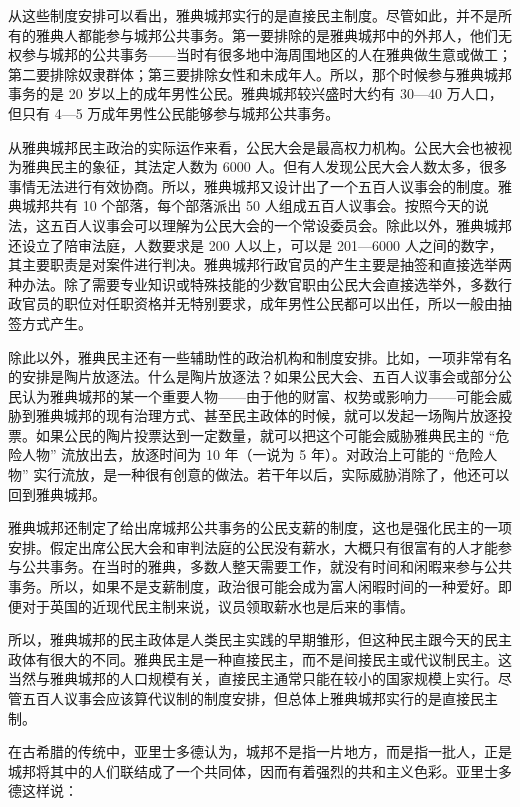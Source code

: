 从这些制度安排可以看出，雅典城邦实行的是直接民主制度。尽管如此，并不是所有的雅典人都能参与城邦公共事务。第一要排除的是雅典城邦中的外邦人，他们无权参与城邦的公共事务——当时有很多地中海周围地区的人在雅典做生意或做工；第二要排除奴隶群体；第三要排除女性和未成年人。所以，那个时候参与雅典城邦事务的是 20 岁以上的成年男性公民。雅典城邦较兴盛时大约有 30—40 万人口，但只有 4—5 万成年男性公民能够参与城邦公共事务。

从雅典城邦民主政治的实际运作来看，公民大会是最高权力机构。公民大会也被视为雅典民主的象征，其法定人数为 6000 人。但有人发现公民大会人数太多，很多事情无法进行有效协商。所以，雅典城邦又设计出了一个五百人议事会的制度。雅典城邦共有 10 个部落，每个部落派出 50 人组成五百人议事会。按照今天的说法，这五百人议事会可以理解为公民大会的一个常设委员会。除此以外，雅典城邦还设立了陪审法庭，人数要求是 200 人以上，可以是 201—6000 人之间的数字，其主要职责是对案件进行判决。雅典城邦行政官员的产生主要是抽签和直接选举两种办法。除了需要专业知识或特殊技能的少数官职由公民大会直接选举外，多数行政官员的职位对任职资格并无特别要求，成年男性公民都可以出任，所以一般由抽签方式产生。

除此以外，雅典民主还有一些辅助性的政治机构和制度安排。比如，一项非常有名的安排是陶片放逐法。什么是陶片放逐法？如果公民大会、五百人议事会或部分公民认为雅典城邦的某一个重要人物——由于他的财富、权势或影响力——可能会威胁到雅典城邦的现有治理方式、甚至民主政体的时候，就可以发起一场陶片放逐投票。如果公民的陶片投票达到一定数量，就可以把这个可能会威胁雅典民主的 “危险人物” 流放出去，放逐时间为 10 年（一说为 5 年）。对政治上可能的 “危险人物” 实行流放，是一种很有创意的做法。若干年以后，实际威胁消除了，他还可以回到雅典城邦。

雅典城邦还制定了给出席城邦公共事务的公民支薪的制度，这也是强化民主的一项安排。假定出席公民大会和审判法庭的公民没有薪水，大概只有很富有的人才能参与公共事务。在当时的雅典，多数人整天需要工作，就没有时间和闲暇来参与公共事务。所以，如果不是支薪制度，政治很可能会成为富人闲暇时间的一种爱好。即便对于英国的近现代民主制来说，议员领取薪水也是后来的事情。

所以，雅典城邦的民主政体是人类民主实践的早期雏形，但这种民主跟今天的民主政体有很大的不同。雅典民主是一种直接民主，而不是间接民主或代议制民主。这当然与雅典城邦的人口规模有关，直接民主通常只能在较小的国家规模上实行。尽管五百人议事会应该算代议制的制度安排，但总体上雅典城邦实行的是直接民主制。

在古希腊的传统中，亚里士多德认为，城邦不是指一片地方，而是指一批人，正是城邦将其中的人们联结成了一个共同体，因而有着强烈的共和主义色彩。亚里士多德这样说：

